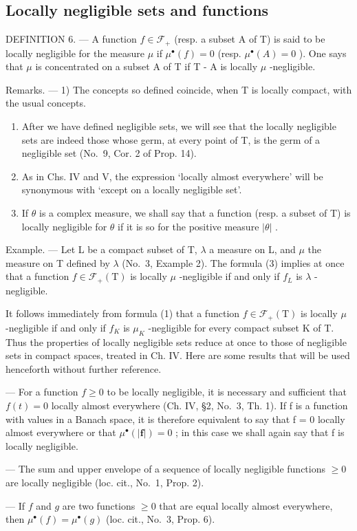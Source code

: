 \subsection{Locally negligible sets and functions}

DEFINITION 6. --- A function \(f \in \mathcal{F}_{+}\) (resp. a subset A of T) is said to be locally negligible for the measure \(\mu\) if \(\mu^{\bullet}(f) = 0\) (resp. \(\mu^{\bullet}(A) = 0\) ). One says that \(\mu\) is concentrated on a subset A of T if T - A is locally \(\mu\) -negligible.

Remarks. --- 1) The concepts so defined coincide, when T is locally compact, with the usual concepts.

\begin{enumerate}
\def\labelenumi{\arabic{enumi})}
\setcounter{enumi}{1}
\item
  After we have defined negligible sets, we will see that the locally negligible sets are indeed those whose germ, at every point of T, is the germ of a negligible set (No.~9, Cor. 2 of Prop. 14).
\item
  As in Chs. IV and V, the expression `locally almost everywhere' will be synonymous with `except on a locally negligible set'.
\item
  If \(\theta\) is a complex measure, we shall say that a function (resp. a subset of T) is locally negligible for \(\theta\) if it is so for the positive measure \(|\theta|\) .
\end{enumerate}

Example. --- Let L be a compact subset of T, \(\lambda\) a measure on L, and \(\mu\) the measure on T defined by \(\lambda\) (No.~3, Example 2). The formula (3) implies at once that a function \(f \in \mathcal{F}_{+}(\mathrm{T})\) is locally \(\mu\) -negligible if and only if \(f_{L}\) is \(\lambda\) -negligible.

It follows immediately from formula (1) that a function \(f \in \mathcal{F}_{+}(\mathrm{T})\) is locally \(\mu\) -negligible if and only if \(f_{K}\) is \(\mu_{K}\) -negligible for every compact subset K of T. Thus the properties of locally negligible sets reduce at once to those of negligible sets in compact spaces, treated in Ch. IV. Here are some results that will be used henceforth without further reference.

--- For a function \(f \geqslant 0\) to be locally negligible, it is necessary and sufficient that \(f(t) = 0\) locally almost everywhere (Ch. IV, §2, No.~3, Th. 1). If f is a function with values in a Banach space, it is therefore equivalent to say that f = 0 locally almost everywhere or that \(\mu^{\bullet}(|\mathbf{f}|) = 0\) ; in this case we shall again say that f is locally negligible.

--- The sum and upper envelope of a sequence of locally negligible functions \(\geqslant0\) are locally negligible (loc. cit., No.~1, Prop. 2).

--- If \(f\) and \(g\) are two functions \(\geqslant 0\) that are equal locally almost everywhere, then \(\mu^{\bullet}(f) = \mu^{\bullet}(g)\) (loc. cit., No.~3, Prop. 6).

